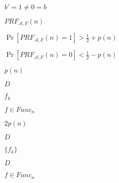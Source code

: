 \documentclass[10pt]{book}
\begin{document}
\begin{mdSnippets}
\begin{mdInlineSnippet}[c6f3aa80334059976c38a73914dd7d45]
$b' = 1 \neq 0 = b$\end{mdInlineSnippet}%
\begin{mdInlineSnippet}%
$PRF_{\mathcal{A},F}(n)$\end{mdInlineSnippet}%
\begin{mdInlineSnippet}[04a25ef2aa49a0c3a0d4ffe94a2ad4af]%
$\Pr[PRF_{\mathcal{A},F}(n) = 1] > \frac{1}{2} + p(n)$\end{mdInlineSnippet}%
\begin{mdInlineSnippet}%
$\Pr[PRF_{\mathcal{A},F}(n) = 0] < \frac{1}{2} - p(n)$\end{mdInlineSnippet}%
\begin{mdInlineSnippet}%
$p(n)$\end{mdInlineSnippet}%
\begin{mdInlineSnippet}[f623e75af30e62bbd73d6df5b50bb7b5]%
$D$\end{mdInlineSnippet}%
\begin{mdInlineSnippet}[f55fcd9745b34e40639d81c49eb07a8e]%
$f_k$\end{mdInlineSnippet}%
\begin{mdInlineSnippet}[ea5f4c914c5aa7061038128810237766]%
$f \in Func_n$\end{mdInlineSnippet}%
\begin{mdInlineSnippet}%
$2p(n)$\end{mdInlineSnippet}%
\begin{mdInlineSnippet}[f623e75af30e62bbd73d6df5b50bb7b5]%
$D$\end{mdInlineSnippet}%
\begin{mdInlineSnippet}%
$\{f_k\}$\end{mdInlineSnippet}%
\begin{mdInlineSnippet}[f623e75af30e62bbd73d6df5b50bb7b5]%
$D$\end{mdInlineSnippet}%
\begin{mdInlineSnippet}[ea5f4c914c5aa7061038128810237766]%
$f \in Func_n$\end{mdInlineSnippet}%
\begin{mdInlineSnippet}[f55fcd9745b34e40639d81c49eb07a8e]%

\end{mdInlineSnippet}
\end{mdSnippets}
\end{document}
